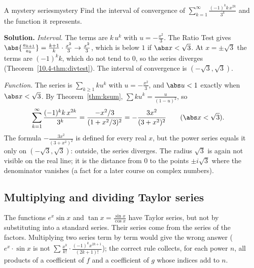 \documentclass[11pt]{article}
\begin{document}
\begin{exmp}{A mystery series}{mystery}
Find the interval of convergence of $\displaystyle\sum_{k=1}^\infty\frac{(-1)^kk\,x^{2k}}{3^k}$ and the function it represents.

\textbf{Solution.} \emph{Interval.} The terms are $k\,u^k$ with $u=-\frac{x^2}3$. The Ratio Test gives $\abs{\frac{a_{k+1}}{a_k}}=\frac{k+1}k\cdot\frac{x^2}3\to\frac{x^2}3$, which is below $1$ if $\abs x<\sqrt3$. At $x=\pm\sqrt3$ the terms are $(-1)^kk$, which do not tend to $0$, so the series diverges (Theorem~\ref{10.4-thm:divtest}). The interval of convergence is $(-\sqrt3,\sqrt3)$.

\emph{Function.} The series is $\sum_{k\ge1}ku^k$ with $u=-\frac{x^2}3$, and $\abs u<1$ exactly when $\abs x<\sqrt3$. By Theorem~\ref{thm:ksum}, $\sum ku^k=\frac u{(1-u)^2}$, so
\[
\sum_{k=1}^\infty\frac{(-1)^kk\,x^{2k}}{3^k}=\frac{-x^2/3}{(1+x^2/3)^2}=-\frac{3x^2}{(3+x^2)^2}\qquad(\abs x<\sqrt3).
\]
The formula $-\frac{3x^2}{(3+x^2)^2}$ is defined for every real $x$, but the power series equals it only on $(-\sqrt3,\sqrt3)$: outside, the series diverges. The radius $\sqrt3$ is again not visible on the real line; it is the distance from $0$ to the points $\pm i\sqrt3$ where the denominator vanishes (a fact for a later course on complex numbers).
\end{exmp}

\subsection*{Multiplying and dividing Taylor series}

The functions $e^x\sin x$ and $\tan x=\frac{\sin x}{\cos x}$ have Taylor series, but not by substituting into a standard series. Their series come from the series of the factors. Multiplying two series term by term would give the wrong answer ($e^x\cdot\sin x$ is not $\sum\frac{x^k}{k!}\cdot\frac{(-1)^kx^{2k+1}}{(2k+1)!}$); the correct rule collects, for each power $n$, all products of a coefficient of $f$ and a coefficient of $g$ whose indices add to $n$.
\end{document}
